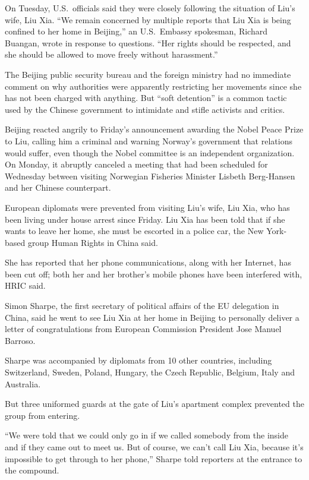 ﻿\documentclass[12pt]{article}
\begin{document}
On Tuesday, U.S.~officials said they were closely following the situation of Liu's wife, Liu Xia.
``We remain concerned by multiple reports that Liu Xia is being confined to her home in Beijing,''
an U.S.~Embassy spokesman, Richard Buangan, wrote in response to questions. ``Her rights should be
respected, and she should be allowed to move freely without harassment.''

The Beijing public security bureau and the foreign ministry had no immediate comment on why
authorities were apparently restricting her movements since she has not been charged with anything.
But ``soft detention'' is a common tactic used by the Chinese government to intimidate and stifle
activists and critics.

Beijing reacted angrily to Friday's announcement awarding the Nobel Peace Prize to Liu, calling him
a criminal and warning Norway's government that relations would suffer, even though the Nobel
committee is an independent organization. On Monday, it abruptly canceled a meeting that had been
scheduled for Wednesday between visiting Norwegian Fisheries Minister Lisbeth Berg-Hansen and her
Chinese counterpart.

European diplomats were prevented from visiting Liu's wife, Liu Xia, who has been living under house
arrest since Friday. Liu Xia has been told that if she wants to leave her home, she must be escorted
in a police car, the New York-based group Human Rights in China said.

She has reported that her phone communications, along with her Internet, has been cut off; both her
and her brother's mobile phones have been interfered with, HRIC said.

Simon Sharpe, the first secretary of political affairs of the EU delegation in China, said he went
to see Liu Xia at her home in Beijing to personally deliver a letter of congratulations from
European Commission President Jose Manuel Barroso.

Sharpe was accompanied by diplomats from 10 other countries, including Switzerland, Sweden, Poland,
Hungary, the Czech Republic, Belgium, Italy and Australia.

But three uniformed guards at the gate of Liu's apartment complex prevented the group from entering.

``We were told that we could only go in if we called somebody from the inside and if they came out
to meet us. But of course, we can't call Liu Xia, because it's impossible to get through to her
phone,'' Sharpe told reporters at the entrance to the compound.
\end{document}
